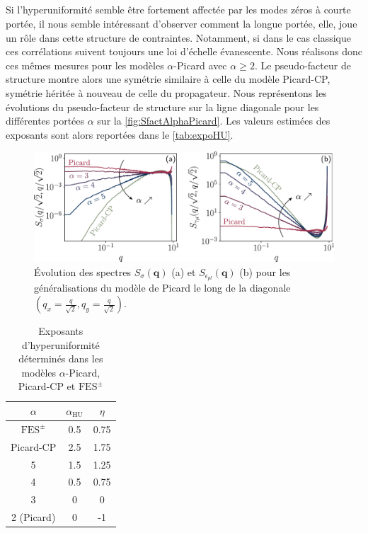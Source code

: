 \subparagraph{}Si l'hyperuniformité semble être fortement affectée par les modes zéros à courte portée, il nous semble intéressant d'observer comment la longue portée, elle, joue un rôle dans cette structure de contraintes. Notamment, si dans le cas classique ces corrélations suivent toujours une loi d'échelle évanescente. Nous réalisons donc ces mêmes mesures pour les modèles $\alpha$-Picard avec $\alpha \geq 2$. Le pseudo-facteur de structure montre alors une symétrie similaire à celle du modèle Picard-CP, symétrie héritée à nouveau de celle du propagateur. Nous représentons les évolutions du pseudo-facteur de structure sur la ligne diagonale pour les différentes portées $\alpha$ sur la \autoref{fig:SfactAlphaPicard}. Les valeurs estimées des exposants sont alors reportées dans le \autoref{tab:expoHU}.

\begin{figure}[h]
	\centering
	\includegraphics[width=\textwidth]{Chapitre4/Figures/Correlations/Evol_Sfact.pdf}
	\caption{Évolution des spectres $S_\sigma(\mathbf{q})$ (a) et $S_{\epsilon_{pl}}(\mathbf{q})$ (b) pour les généralisations du modèle de Picard le long de la diagonale $(q_x=\frac{q}{\sqrt{2}},q_y=\frac{q}{\sqrt{2}})$.}
	\label{fig:SfactAlphaPicard}
\end{figure}

\begin{table}[h]
\centering
\begin{tabular}{ccc}
\hline \hline $\alpha$ & $\alpha_\text{HU}$ & $\eta$ \\
\hline 
$\text{FES}^\pm$ & 0.5 & 0.75  \\
Picard-CP & 2.5 & 1.75  \\
5 & 1.5 & 1.25  \\
4 & 0.5 & 0.75  \\
3 & 0 & 0  \\
2 (Picard) & 0 & -1 \\
\hline \hline
\end{tabular}
\caption{Exposants d'hyperuniformité déterminés dans les modèles $\alpha$-Picard, Picard-CP et $\text{FES}^\pm$}
\label{tab:expoHU}
\end{table}

